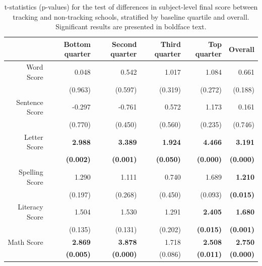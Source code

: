 \documentclass[11pt]{article}
\begin{document}
\begin{table}[ht]
\centering
\begin{tabular}{rrrrrr}
  \hline
 & Bottom quarter & Second quarter & Third quarter & Top quarter & Overall \\ 
  \hline
Word Score & 0.048 & 0.542 & 1.017 & 1.084 & 0.661 \\ \vspace{2mm}
   & (0.963) & (0.597) & (0.319) & (0.272) & (0.188) \\ 
  Sentence Score & -0.297 & -0.761 & 0.572 & 1.173 & 0.161 \\ \vspace{2mm}
   & (0.770) & (0.450) & (0.560) & (0.235) & (0.746) \\ 
  Letter Score & {\bf 2.988} & {\bf 3.389} & {\bf 1.924} & {\bf 4.466} & {\bf 3.191} \\ \vspace{2mm}
   & {\bf (0.002)} & {\bf (0.001)} & {\bf (0.050)} & {\bf (0.000)} & {\bf (0.000)} \\ 
  Spelling Score & 1.290 & 1.111 & 0.740 & 1.689 & {\bf 1.210} \\ \vspace{2mm}
   & (0.197) & (0.268) & (0.450) & (0.093) & {\bf (0.015)} \\ 
  Literacy Score & 1.504 & 1.530 & 1.291 &{\bf  2.405} &{\bf  1.680 }\\ \vspace{2mm}
   & (0.135) & (0.131) & (0.202) & {\bf (0.015)} & {\bf (0.001) }\\ 
  Math Score & {\bf 2.869 }& {\bf 3.878} & 1.718 & {\bf 2.508 }& {\bf 2.750 }\\ 
   & {\bf (0.005)} & {\bf (0.000)} &  (0.086) & {\bf (0.011)} & {\bf (0.000) }\\ 
   \hline
\end{tabular}
\caption{t-statistics (p-values) for the test of differences in subject-level final score between tracking and non-tracking schools, stratified by baseline quartile and overall. Significant results are presented in boldface text.} \label{tab:stratif-topics}
\end{table} %
\end{document}
